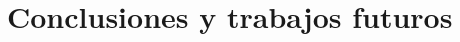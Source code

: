 \documentclass[IB]{TFUOC}%
\begin{document}



\chapter{Conclusiones y trabajos futuros}
\end{document}

